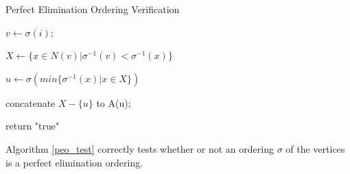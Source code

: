 \begin{algorithm}[H]

\SetAlgoLined
\caption{Perfect Elimination Ordering Verification}
\label{peo_test}
\BlankLine
\Begin
{    
   {
   		$v \leftarrow \sigma(i)$;
        
        $X \leftarrow \{x \in N(v)|\sigma^{-1}(v) < \sigma^{-1}(x)\}$
        
        
        $u \leftarrow \sigma(min \{\sigma^{-1}(x)|x \in X \})$
        
        concatenate $X-\{u\}$ to A(u);
        
        
        
        
	}
    return "true"
}       
\end{algorithm}

\begin{theorem}
\cite{rose1976algorithmic}
Algorithm \ref{peo_test} correctly tests whether or not an ordering $\sigma$ of the vertices is a perfect elimination ordering.
\end{theorem}




